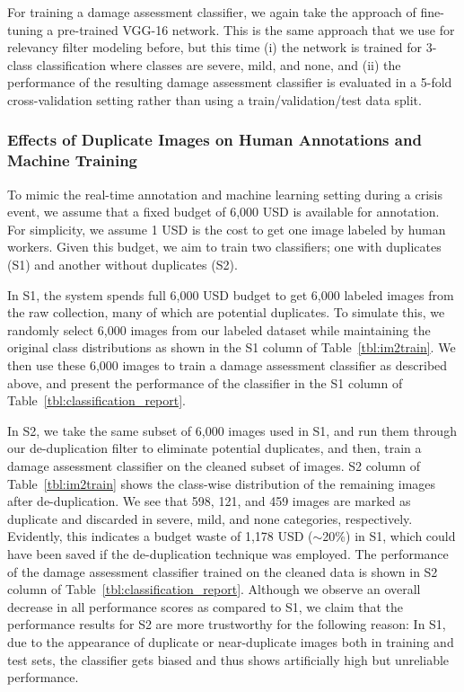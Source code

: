 \documentclass{iscram}
\begin{document}
For training a damage assessment classifier, we again take the approach of fine-tuning a pre-trained VGG-16 network. This is the same approach that we use for relevancy filter modeling before, but this time (i) the network is trained for 3-class classification where classes are severe, mild, and none, and (ii) the performance of the resulting damage assessment classifier is evaluated in a 5-fold cross-validation setting rather than using a train/validation/test data split.

\subsubsection{Effects of Duplicate Images on Human Annotations and Machine Training}%
To mimic the real-time annotation and machine learning setting during a crisis event, we assume that a fixed budget of 6,000 USD is available for annotation. For simplicity, we assume 1 USD is the cost to get one image labeled by human workers. Given this budget, we aim to train two classifiers; one with duplicates (S1) and another without duplicates (S2).

In S1, the system spends full 6,000 USD budget to get 6,000 labeled images from the raw collection, many of which are potential duplicates. 
To simulate this, we randomly select 6,000 images from our labeled dataset while maintaining the original class distributions as shown in the S1 column of Table~\ref{tbl:im2train}. We then use these 6,000 images to train a damage assessment classifier as described above, and present the performance of the classifier in the S1 column of Table~\ref{tbl:classification_report}. 

In S2, we take the same subset of 6,000 images used in S1, and run them through our de-duplication filter to eliminate potential duplicates, and then, train a damage assessment classifier on the cleaned subset of images. S2 column of Table~\ref{tbl:im2train} shows the class-wise distribution of the remaining images after de-duplication. We see that 598, 121, and 459 images are marked as duplicate and discarded in severe, mild, and none categories, respectively. Evidently, this indicates a budget waste of 1,178 USD ($\sim$20\%) in S1, which could have been saved if the de-duplication technique was employed.
The performance of the damage assessment classifier trained on the cleaned data is shown in S2 column of Table~\ref{tbl:classification_report}. Although we observe an overall decrease in all performance scores as compared to S1, we claim that the performance results for S2 are more trustworthy for the following reason: In S1, due to the appearance of duplicate or near-duplicate images both in training and test sets, the classifier gets biased and thus shows artificially high but unreliable performance.
\end{document}
